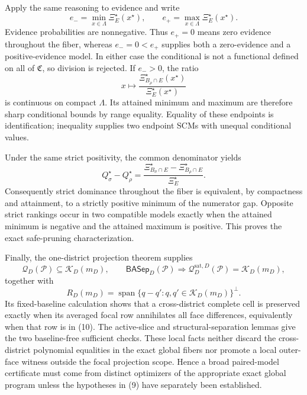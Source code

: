 Apply the same reasoning to evidence and write
\[
e_-=\min_{x\in\Lambda}\Xi_E^\star(x^\star),\qquad
e_+=\max_{x\in\Lambda}\Xi_E^\star(x^\star).\tag{6}
\]
Evidence probabilities are nonnegative. Thus \(e_+=0\) means zero evidence throughout the fiber, whereas \(e_-=0<e_+\) supplies both a zero-evidence and a positive-evidence model. In either case the conditional is not a functional defined on all of \(\mathfrak C\), so division is rejected. If \(e_->0\), the ratio
\[
x\longmapsto
\frac{\Xi_{B_\rho\cap E}^\star(x^\star)}{\Xi_E^\star(x^\star)}\tag{7}
\]
is continuous on compact \(\Lambda\). Its attained minimum and maximum are therefore sharp conditional bounds by range equality. Equality of these endpoints is identification; inequality supplies two endpoint SCMs with unequal conditional values.

Under the same strict positivity, the common denominator yields
\[
Q_\sigma^\star-Q_\rho^\star
=\frac{\Xi_{B_\sigma\cap E}^\star-\Xi_{B_\rho\cap E}^\star}
{\Xi_E^\star}.\tag{8}
\]
Consequently strict dominance throughout the fiber is equivalent, by compactness and attainment, to a strictly positive minimum of the numerator gap. Opposite strict rankings occur in two compatible models exactly when the attained minimum is negative and the attained maximum is positive. This proves the exact safe-pruning characterization.

Finally, the one-district projection theorem supplies
\[
\mathcal Q_D(\mathcal P)\subseteq\mathcal K_D(m_D),\qquad
\mathsf{BASep}_D(\mathcal P)\Longrightarrow
\mathcal Q_D^{\mathrm{sat},D}(\mathcal P)=\mathcal K_D(m_D),\tag{9}
\]
together with
\[
R_D(m_D)=\operatorname{span}\{q-q':q,q'\in\mathcal K_D(m_D)\}^\perp.\tag{10}
\]
Its fixed-baseline calculation shows that a cross-district complete cell is preserved exactly when its averaged focal row annihilates all face differences, equivalently when that row is in (10). The active-slice and structural-separation lemmas give the two baseline-free sufficient checks. These local facts neither discard the cross-district polynomial equalities in the exact global fibers nor promote a local outer-face witness outside the focal projection scope. Hence a broad paired-model certificate must come from distinct optimizers of the appropriate exact global program unless the hypotheses in (9) have separately been established.